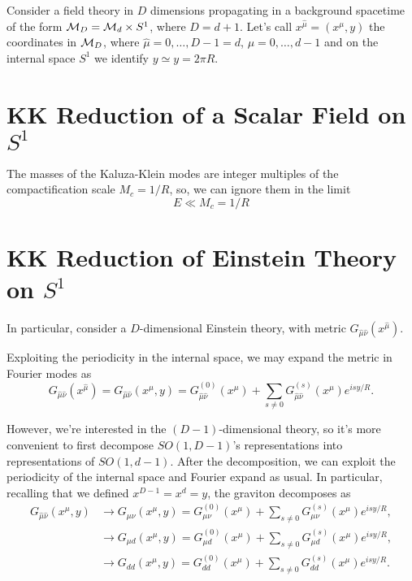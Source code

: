 Consider a field theory in $D$ dimensions propagating in a background spacetime of the form $\mathcal{M}_D = \mathcal{M}_d \times S^1$, where $D = d+1$. Let's call $x^{\hat{\mu}} = (x^\mu, y)$ the coordinates in $\mathcal{M}_D$, where $\hat{\mu} = 0, \dots, D-1 = d$, $\mu = 0, \dots, d-1$ and on the internal space $S^1$ we identify $y \simeq y = 2\pi R$.

\section{KK Reduction of a Scalar Field on \texorpdfstring{$S^1$}{S1}}
The masses of the Kaluza-Klein modes are integer multiples of the compactification scale $M_c = 1 / R$, so, we can ignore them in the limit
    \begin{equation}
        E \ll M_c = 1/R
    \end{equation}


\section{KK Reduction of Einstein Theory on \texorpdfstring{$S^1$}{S1}}
In particular, consider a $D$-dimensional Einstein theory, with metric $G_{\hat{\mu} \hat{\nu}} (x^{\hat{\mu}})$.

Exploiting the periodicity in the internal space, we may expand the metric in Fourier modes as
\begin{equation}
    G_{\hat{\mu} \hat{\nu}} (x^{\hat{\mu}}) = G_{\hat{\mu} \hat{\nu}} (x^\mu, y) = G^{(0)}_{\hat{\mu} \hat{\nu}} (x^\mu)+ \sum_{s \neq 0} G^{(s)}_{\hat{\mu} \hat{\nu}} (x^\mu) e^{i s y / R}.
\end{equation}

However, we're interested in the $(D-1)$-dimensional theory, so it's more convenient to first decompose $SO(1,D-1)$'s representations into representations of $SO(1,d-1)$. After the decomposition, we can exploit the periodicity of the internal space and Fourier expand as usual. In particular, recalling that we defined $x^{D-1} = x^d = y$, the graviton decomposes as
\begin{align}
    G_{\hat{\mu}\hat{\nu}} (x^\mu, y) 
    &\to G_{\mu\nu}(x^\mu, y) = G^{(0)}_{{\mu} {\nu}} (x^\mu)+ \sum_{s \neq 0} G^{(s)}_{{\mu} {\nu}} (x^\mu) e^{is y / R} ,\\
    &\to G_{\mu d} (x^\mu, y) = G^{(0)}_{{\mu} {d}} (x^\mu)+ \sum_{s \neq 0} G^{(s)}_{{\mu} {d}} (x^\mu) e^{is y / R} ,\\
    &\to G_{dd} (x^\mu, y) = G^{(0)}_{{d} {d}} (x^\mu)+ \sum_{s \neq 0} G^{(s)}_{{d} {d}} (x^\mu) e^{is y / R} . \\
\end{align}

